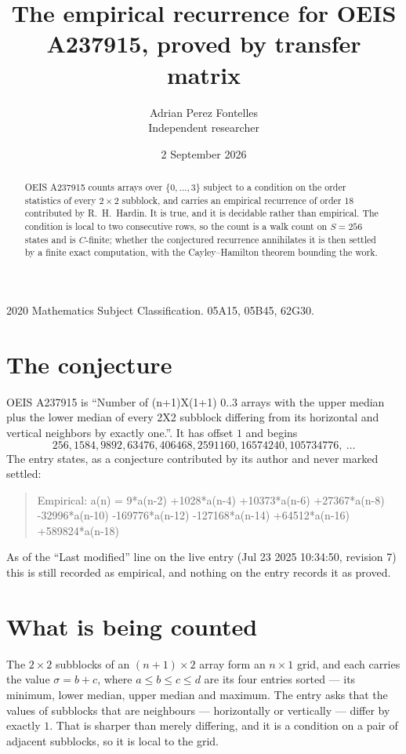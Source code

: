 \documentclass[11pt,a4paper]{article}
\title{The empirical recurrence for OEIS A237915, proved by transfer matrix}
\author{Adrian Perez Fontelles\\ \small Independent researcher}
\date{2 September 2026}
\theoremstyle{plain}
\theoremstyle{definition}
\begin{document}
\maketitle

\begin{abstract}
OEIS A237915 counts arrays over $\{0,\dots,3\}$ subject to a condition on the order
statistics of every $2\times2$ subblock, and carries an empirical recurrence of order
$18$ contributed by R.~H.~Hardin. It is true, and it is decidable rather than empirical.
The condition is local to two consecutive rows, so the count is a walk count on $S=256$
states and is $C$-finite; whether the conjectured recurrence annihilates it is then settled by
a finite exact computation, with the Cayley--Hamilton theorem bounding the work.
\end{abstract}

\noindent\small 2020 Mathematics Subject Classification. 05A15, 05B45, 62G30.\normalsize

\section{The conjecture}

OEIS A237915 is ``Number of (n+1)X(1+1) 0..3 arrays with the upper median plus the lower median of every 2X2 subblock differing from its horizontal and vertical neighbors by exactly one.''. It has offset $1$ and begins
\[
256, 1584, 9892, 63476, 406468, 2591160, 16574240, 105734776,\ \dots
\]
The entry states, as a conjecture contributed by its author and never marked settled:
\begin{quote}
Empirical: a(n) = 9*a(n-2) +1028*a(n-4) +10373*a(n-6) +27367*a(n-8) -32996*a(n-10) -169776*a(n-12) -127168*a(n-14) +64512*a(n-16) +589824*a(n-18)
\end{quote}
As of the ``Last modified'' line on the live entry (Jul 23 2025 10:34:50, revision 7) this is still
recorded as empirical, and nothing on the entry records it as proved.

\section{What is being counted}

The $2\times2$ subblocks of an $(n+1)\times2$ array form an
$n\times1$ grid, and each carries the value $\sigma=b+c$, where $a\le b\le c\le d$ are its four entries sorted --- its minimum, lower median, upper median and maximum. The entry asks that the values of
subblocks that are neighbours --- horizontally or vertically --- differ by exactly $1$.
That is sharper than merely differing, and it is a condition on a pair of adjacent subblocks,
so it is local to the grid.
\end{document}
